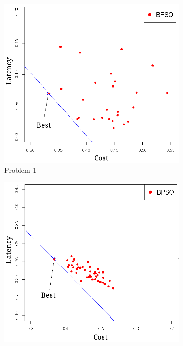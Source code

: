 \begin{figure}[!h]
   \centering
   \begin{subfigure}{0.3\textwidth}
       \includegraphics[width=\textwidth]{pics/binary1.png}
	   \caption{Problem 1}
   \end{subfigure}
   \begin{subfigure}{0.3\textwidth}
       \includegraphics[width=\textwidth]{pics/binary2.png}

\end{subfigure}
\end{figure}
